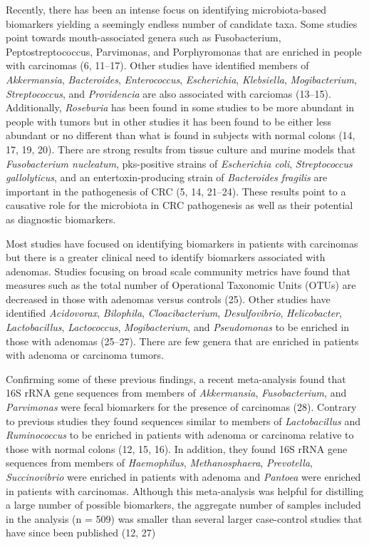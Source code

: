 \documentclass[12pt,]{article}
\begin{document}
Recently, there has been an intense focus on identifying
microbiota-based biomarkers yielding a seemingly endless number of
candidate taxa. Some studies point towards mouth-associated genera such
as Fusobacterium, Peptostreptococcus, Parvimonas, and Porphyromonas that
are enriched in people with carcinomas (6, 11--17). Other studies have
identified members of \emph{Akkermansia}, \emph{Bacteroides},
\emph{Enterococcus}, \emph{Escherichia}, \emph{Klebsiella},
\emph{Mogibacterium}, \emph{Streptococcus}, and \emph{Providencia} are
also associated with carciomas (13--15). Additionally, \emph{Roseburia}
has been found in some studies to be more abundant in people with tumors
but in other studies it has been found to be either less abundant or no
different than what is found in subjects with normal colons (14, 17, 19,
20). There are strong results from tissue culture and murine models that
\emph{Fusobacterium nucleatum}, pks-positive strains of
\emph{Escherichia coli}, \emph{Streptococcus gallolyticus}, and an
entertoxin-producing strain of \emph{Bacteroides fragilis} are important
in the pathogenesis of CRC (5, 14, 21--24). These results point to a
causative role for the microbiota in CRC pathogenesis as well as their
potential as diagnostic biomarkers.

Most studies have focused on identifying biomarkers in patients with
carcinomas but there is a greater clinical need to identify biomarkers
associated with adenomas. Studies focusing on broad scale community
metrics have found that measures such as the total number of Operational
Taxonomic Units (OTUs) are decreased in those with adenomas versus
controls (25). Other studies have identified \emph{Acidovorax},
\emph{Bilophila}, \emph{Cloacibacterium}, \emph{Desulfovibrio},
\emph{Helicobacter}, \emph{Lactobacillus}, \emph{Lactococcus},
\emph{Mogibacterium}, and \emph{Pseudomonas} to be enriched in those
with adenomas (25--27). There are few genera that are enriched in
patients with adenoma or carcinoma tumors.

Confirming some of these previous findings, a recent meta-analysis found
that 16S rRNA gene sequences from members of \emph{Akkermansia},
\emph{Fusobacterium}, and \emph{Parvimonas} were fecal biomarkers for
the presence of carcinomas (28). Contrary to previous studies they found
sequences similar to members of \emph{Lactobacillus} and
\emph{Ruminococcus} to be enriched in patients with adenoma or carcinoma
relative to those with normal colons (12, 15, 16). In addition, they
found 16S rRNA gene sequences from members of \emph{Haemophilus},
\emph{Methanosphaera}, \emph{Prevotella}, \emph{Succinovibrio} were
enriched in patients with adenoma and \emph{Pantoea} were enriched in
patients with carcinomas. Although this meta-analysis was helpful for
distilling a large number of possible biomarkers, the aggregate number
of samples included in the analysis (n = 509) was smaller than several
larger case-control studies that have since been published (12, 27)
\end{document}

